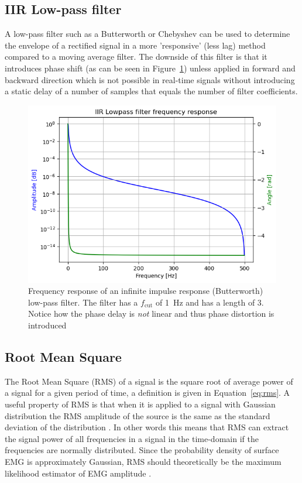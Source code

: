 \subsection{IIR Low-pass filter}
A low-pass filter such as a Butterworth or Chebyshev can be used to determine the envelope of a rectified signal in a more 'responsive' (less lag) method compared to a moving average filter. The downside of this filter is that it introduces phase shift (as can be seen in Figure~\ref{fig:iirfilter_phaseshift}) unless applied in forward and backward direction \cite{rose2011electromyogram} which is not possible in real-time signals without introducing a static delay of a number of samples that equals the number of filter coefficients.

\begin{figure}[h!t]
	\begin{center}
		\includegraphics[width=0.7\columnwidth]{images/iirfilter_phaseshift.png}
	\end{center}
	\caption{Frequency response of an infinite impulse response (Butterworth) low-pass filter. The filter has a $f_\text{cut}$ of \SI{1}{Hz} and has a length of 3. Notice how the phase delay is \textit{not} linear and thus phase distortion is introduced}
	\label{fig:iirfilter_phaseshift}
\end{figure}

\subsection{Root Mean Square}
The Root Mean Square (RMS) of a signal is the square root of average power of a signal for a given period of time, a definition is given in Equation~\ref{eq:rms}. A useful property of RMS is that when it is applied to a signal with Gaussian distribution the RMS amplitude of the source is the same as the standard deviation of the distribution \cite{rms_standard_deviation}. In other words this means that RMS can extract the signal power of all frequencies in a signal in the time-domain if the frequencies are normally distributed. Since the probability density of surface EMG is approximately Gaussian, RMS should theoretically be the maximum likelihood estimator of EMG amplitude \cite{semg_signals_analysis_and_applications}.


